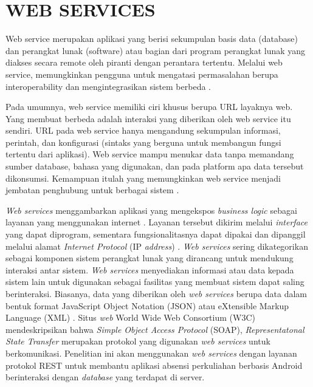 \section{\uppercase{WEB SERVICES}}
\par Web service merupakan aplikasi yang berisi sekumpulan basis data (database) dan perangkat lunak (software) atau bagian dari program perangkat lunak yang diakses secara remote oleh piranti dengan perantara tertentu. Melalui web service, memungkinkan pengguna untuk mengatasi permasalahan berupa interoperability dan mengintegrasikan sistem berbeda \citep{Chuangwei2011}.

\par Pada umumnya, web service memiliki ciri khusus berupa URL layaknya web. Yang membuat berbeda adalah interaksi yang diberikan oleh web service itu sendiri. URL pada web service hanya mengandung sekumpulan informasi, perintah, dan konfigurasi (sintaks yang berguna untuk membangun fungsi tertentu dari aplikasi). Web service mampu menukar data tanpa memandang sumber database, bahasa yang digunakan, dan pada platform apa data tersebut dikonsumsi. Kemampuan itulah yang memungkinkan web service menjadi jembatan penghubung untuk berbagai sistem \citep{Chuangwei2011}.

\par \textit{Web services} menggambarkan aplikasi yang mengekspos \textit{business logic} sebagai layanan yang menggunakan internet \citep{Mironela2009}. Layanan tersebut dikirim melalui \textit{interface} yang dapat diprogram, sementara fungsionalitasnya dapat dipakai dan dipanggil melalui alamat \textit{Internet Protocol} (IP \textit{address}) \citep{Wagh2012}. \textit{Web services} sering dikategorikan sebagai komponen sistem perangkat lunak yang dirancang untuk mendukung interaksi antar sistem. \textit{Web services} menyediakan informasi atau data kepada sistem lain untuk digunakan sebagai fasilitas yang membuat sistem dapat saling berinteraksi. Biasanya, data yang diberikan oleh \textit{web services} berupa data dalam bentuk format JavaScript Object Notation (JSON) atau eXtensible Markup Language (XML) \citep{Rahman2013}. Situs \textit{web} World Wide Web Consortium (W3C) mendeskripsikan  bahwa \textit{Simple Object Access Protocol} (SOAP), \textit{Representatonal State Transfer} merupakan protokol yang digunakan \textit{web services} untuk berkomunikasi. Penelitian ini akan menggunakan \textit{web services} dengan layanan protokol REST untuk membantu aplikasi absensi perkuliahan berbasis Android berinteraksi dengan \textit{database} yang terdapat di server.

